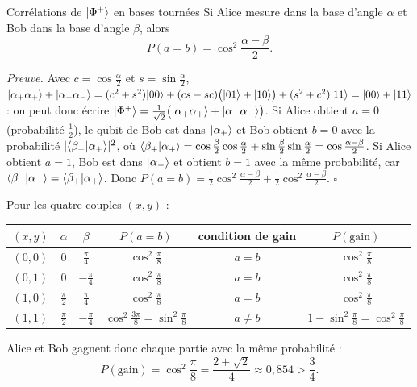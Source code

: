 \begin{resultat}{Corrélations de $|\Phi^+\rangle$ en bases tournées}
Si Alice mesure dans la base d'angle $\alpha$ et Bob dans la base d'angle $\beta$, alors
\[
  P(a=b)=\cos^2\frac{\alpha-\beta}{2}.
\]
\end{resultat}

\noindent\emph{Preuve.} Avec $c=\cos\frac\alpha2$ et $s=\sin\frac\alpha2$,
$|\alpha_+\alpha_+\rangle+|\alpha_-\alpha_-\rangle=(c^2+s^2)|00\rangle+(cs-sc)\big(|01\rangle+|10\rangle\big)+(s^2+c^2)|11\rangle
=|00\rangle+|11\rangle$ : on peut donc écrire $|\Phi^+\rangle=\frac{1}{\sqrt2}\big(|\alpha_+\alpha_+\rangle+|\alpha_-\alpha_-\rangle\big)$.
Si Alice obtient $a=0$ (probabilité $\frac12$), le qubit de Bob est dans $|\alpha_+\rangle$ et Bob obtient $b=0$
avec la probabilité $|\langle \beta_+|\alpha_+\rangle|^2$, où $\langle \beta_+|\alpha_+\rangle=\cos\frac\beta2\cos\frac\alpha2+\sin\frac\beta2\sin\frac\alpha2=\cos\frac{\alpha-\beta}{2}$.
Si Alice obtient $a=1$, Bob est dans $|\alpha_-\rangle$ et obtient $b=1$ avec la même probabilité, car
$\langle \beta_-|\alpha_-\rangle=\langle \beta_+|\alpha_+\rangle$. Donc
$P(a=b)=\frac12\cos^2\frac{\alpha-\beta}2+\frac12\cos^2\frac{\alpha-\beta}2$. \hfill$\square$

\medskip
\noindent Pour les quatre couples $(x,y)$ :
\begin{center}
\renewcommand{\arraystretch}{1.3}
\begin{tabular}{@{}c c c c c c@{}}
\toprule
$(x,y)$ & $\alpha$ & $\beta$ & $P(a=b)$ & condition de gain & $P(\text{gain})$\\
\midrule
$(0,0)$ & $0$ & $\frac\pi4$ & $\cos^2\frac\pi8$ & $a=b$ & $\cos^2\frac\pi8$\\
$(0,1)$ & $0$ & $-\frac\pi4$ & $\cos^2\frac\pi8$ & $a=b$ & $\cos^2\frac\pi8$\\
$(1,0)$ & $\frac\pi2$ & $\frac\pi4$ & $\cos^2\frac\pi8$ & $a=b$ & $\cos^2\frac\pi8$\\
$(1,1)$ & $\frac\pi2$ & $-\frac\pi4$ & $\cos^2\frac{3\pi}8=\sin^2\frac\pi8$ & $a\neq b$ &
  $1-\sin^2\frac\pi8=\cos^2\frac\pi8$\\
\bottomrule
\end{tabular}
\end{center}
Alice et Bob gagnent donc chaque partie avec la même probabilité :
\[
  P(\text{gain})=\cos^2\frac\pi8=\frac{2+\sqrt2}{4}\approx0{,}854>\frac34 .
\]

